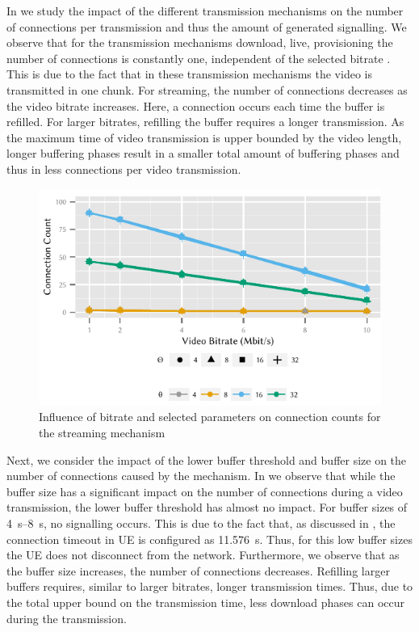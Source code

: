In  we study the impact of the different transmission mechanisms on the number of connections per transmission and thus the amount of generated signalling.
We observe that for the transmission mechanisms download, live, provisioning the number of connections is constantly one, independent of the selected bitrate \bitrate.
This is due to the fact that in these transmission mechanisms the video is transmitted in one chunk.
For streaming, the number of connections decreases as the video bitrate increases.
Here, a connection occurs each time the buffer is refilled.
For larger bitrates, refilling the buffer requires a longer transmission.
As the maximum time of video transmission is upper bounded by the video length, longer buffering phases result in a smaller total amount of buffering phases and thus in less connections per video transmission.

\begin{figure}
  \centering
  \includegraphics{application/lte_video/numerical_evaluation/figures/bitrate2connections_parameters}
  \caption{Influence of bitrate and selected parameters on connection counts for the streaming mechanism}
  \label{fig:application:lte_video:numerical_evaluation:energy_consumption:bitrate2connections_parameters}
\end{figure}

Next, we consider the impact of the lower buffer threshold \bufferlower and buffer size \buffersize on the number of connections \connectioncount caused by the \streaming mechanism.
In  we observe that while the buffer size has a significant impact on the number of connections during a video transmission, the lower buffer threshold has almost no impact.
For buffer sizes of \SIrange{4}{8}{\second}, no signalling occurs.
This is due to the fact that, as discussed in , the connection timeout in \gls{UE} is configured as \SI{11.576}{\second}.
Thus, for this low buffer sizes the \gls{UE} does not disconnect from the network.
Furthermore, we observe that as the buffer size increases, the number of connections decreases.
Refilling larger buffers requires, similar to larger bitrates, longer transmission times.
Thus, due to the total upper bound on the transmission time, less download phases can occur during the transmission.